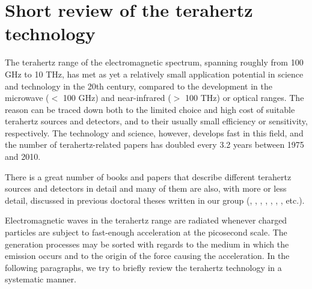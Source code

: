 \section{Short review of the terahertz technology}
The terahertz range of the electromagnetic spectrum, spanning roughly from 100 GHz to 10 THz, has met as yet a relatively small application potential in science and technology in the 20th century, compared to the development in the microwave ($<$ 100 GHz) and near-infrared ($>$ 100 THz) or optical ranges. The reason can be traced down both to the limited choice and high cost of suitable terahertz sources and detectors, and to their usually small efficiency or sensitivity, respectively. The technology and science, however, develops fast in this field, and the number of terahertz-related papers has doubled every 3.2 years \cite{lewis2014review} between 1975 and 2010.  

There is a great number of books and papers that describe different terahertz sources and detectors in detail \cite[pp. 155-158]{lee2008book}\cite{sullivan2012field,lewis2014review}
and many of them are also, with more or less detail, discussed in previous doctoral theses written in our group (\cite[pp. 2-30]{pashkin2004phd}, \cite[pp. 19-25]{nemec2006phd}, \cite[pp. 7-26]{fekete2008phd}, \cite[pp. 11-21]{sibik2010dp}, \cite[pp. 31-45]{yahiaoui2011phd}, \cite[pp. 33-38]{mics2012phd}, \cite[pp. 25-33]{skoromets2013phd}, etc.).

Electromagnetic waves in the terahertz range are radiated whenever charged particles are subject to fast-enough acceleration at the picosecond scale.  The generation processes may be sorted with regards to the medium in which the emission occurs and to the origin of the force causing the acceleration.  In the following paragraphs, we try to briefly review the terahertz technology in a systematic manner.

